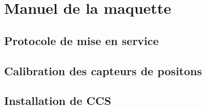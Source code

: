 \chapter{Manuel de la maquette}

\section{Protocole de mise en service}

\section{Calibration des capteurs de positons}

\section{Installation de CCS}